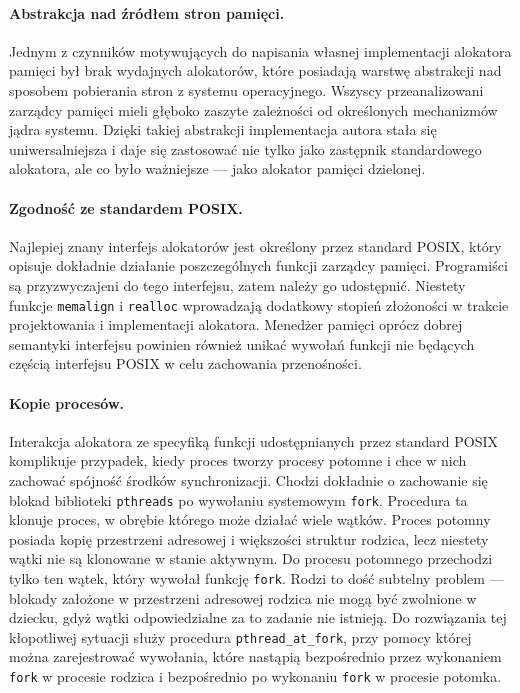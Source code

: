 \documentclass[12pt,a4paper,titlepage,twoside]{mwart}
\begin{document}
\paragraph{Abstrakcja nad źródłem stron pamięci.} Jednym z czynników
motywujących do napisania własnej implementacji alokatora pamięci był brak
wydajnych alokatorów, które posiadają warstwę abstrakcji nad sposobem
pobierania stron z systemu operacyjnego. Wszyscy przeanalizowani zarządcy pamięci
mieli głęboko zaszyte zależności od określonych mechanizmów jądra systemu.
Dzięki takiej abstrakcji implementacja autora stała się uniwersalniejsza i daje
się zastosować nie tylko jako zastępnik standardowego alokatora, ale co było
ważniejsze --- jako alokator pamięci dzielonej.

\paragraph{Zgodność ze standardem POSIX.} Najlepiej znany interfejs alokatorów
jest określony przez standard POSIX, który opisuje dokładnie działanie
poszczególnych funkcji zarządcy pamięci. Programiści są przyzwyczajeni do tego
interfejsu, zatem należy go udostępnić. Niestety funkcje \verb+memalign+ i
\verb+realloc+ wprowadzają dodatkowy stopień złożoności w trakcie projektowania
i implementacji alokatora. Menedżer pamięci oprócz dobrej semantyki interfejsu
powinien również unikać wywołań funkcji nie będących częścią interfejsu POSIX w
celu zachowania przenośności.

\paragraph{Kopie procesów.} Interakcja alokatora ze specyfiką funkcji
udostępnianych przez standard POSIX komplikuje przypadek, kiedy proces tworzy
procesy potomne i chce w nich zachować spójność środków synchronizacji.  Chodzi
dokładnie o zachowanie się blokad biblioteki \texttt{pthreads} po wywołaniu
systemowym \texttt{fork}. Procedura ta klonuje proces, w obrębie którego może
działać wiele wątków. Proces potomny posiada kopię przestrzeni adresowej i
większości struktur rodzica, lecz niestety wątki nie są klonowane w stanie
aktywnym. Do procesu potomnego przechodzi tylko ten wątek, który wywołał
funkcję \verb+fork+. Rodzi to dość subtelny problem --- blokady założone w
przestrzeni adresowej rodzica nie mogą być zwolnione w dziecku, gdyż wątki
odpowiedzialne za to zadanie nie istnieją. Do rozwiązania tej kłopotliwej
sytuacji służy procedura \verb+pthread_at_fork+, przy pomocy której można
zarejestrować wywołania, które nastąpią bezpośrednio przez wykonaniem
\verb+fork+ w procesie rodzica i bezpośrednio po wykonaniu \verb+fork+ w
procesie potomka.
\end{document}
